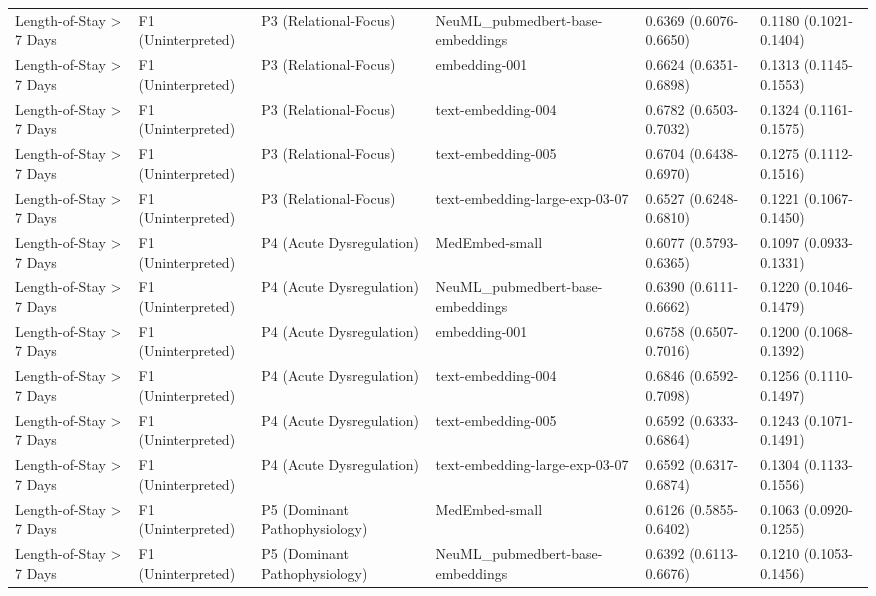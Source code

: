 \begin{tabular}{llllll}
Length-of-Stay \textgreater{} 7 Days & F1 (Uninterpreted) & P3 (Relational-Focus) & NeuML\_pubmedbert-base-embeddings & 0.6369 (0.6076-0.6650) & 0.1180 (0.1021-0.1404) \\
Length-of-Stay \textgreater{} 7 Days & F1 (Uninterpreted) & P3 (Relational-Focus) & embedding-001 & 0.6624 (0.6351-0.6898) & 0.1313 (0.1145-0.1553) \\
Length-of-Stay \textgreater{} 7 Days & F1 (Uninterpreted) & P3 (Relational-Focus) & text-embedding-004 & 0.6782 (0.6503-0.7032) & 0.1324 (0.1161-0.1575) \\
Length-of-Stay \textgreater{} 7 Days & F1 (Uninterpreted) & P3 (Relational-Focus) & text-embedding-005 & 0.6704 (0.6438-0.6970) & 0.1275 (0.1112-0.1516) \\
Length-of-Stay \textgreater{} 7 Days & F1 (Uninterpreted) & P3 (Relational-Focus) & text-embedding-large-exp-03-07 & 0.6527 (0.6248-0.6810) & 0.1221 (0.1067-0.1450) \\
Length-of-Stay \textgreater{} 7 Days & F1 (Uninterpreted) & P4 (Acute Dysregulation) & MedEmbed-small & 0.6077 (0.5793-0.6365) & 0.1097 (0.0933-0.1331) \\
Length-of-Stay \textgreater{} 7 Days & F1 (Uninterpreted) & P4 (Acute Dysregulation) & NeuML\_pubmedbert-base-embeddings & 0.6390 (0.6111-0.6662) & 0.1220 (0.1046-0.1479) \\
Length-of-Stay \textgreater{} 7 Days & F1 (Uninterpreted) & P4 (Acute Dysregulation) & embedding-001 & 0.6758 (0.6507-0.7016) & 0.1200 (0.1068-0.1392) \\
Length-of-Stay \textgreater{} 7 Days & F1 (Uninterpreted) & P4 (Acute Dysregulation) & text-embedding-004 & 0.6846 (0.6592-0.7098) & 0.1256 (0.1110-0.1497) \\
Length-of-Stay \textgreater{} 7 Days & F1 (Uninterpreted) & P4 (Acute Dysregulation) & text-embedding-005 & 0.6592 (0.6333-0.6864) & 0.1243 (0.1071-0.1491) \\
Length-of-Stay \textgreater{} 7 Days & F1 (Uninterpreted) & P4 (Acute Dysregulation) & text-embedding-large-exp-03-07 & 0.6592 (0.6317-0.6874) & 0.1304 (0.1133-0.1556) \\
Length-of-Stay \textgreater{} 7 Days & F1 (Uninterpreted) & P5 (Dominant Pathophysiology) & MedEmbed-small & 0.6126 (0.5855-0.6402) & 0.1063 (0.0920-0.1255) \\
Length-of-Stay \textgreater{} 7 Days & F1 (Uninterpreted) & P5 (Dominant Pathophysiology) & NeuML\_pubmedbert-base-embeddings & 0.6392 (0.6113-0.6676) & 0.1210 (0.1053-0.1456) \\

\end{tabular}
